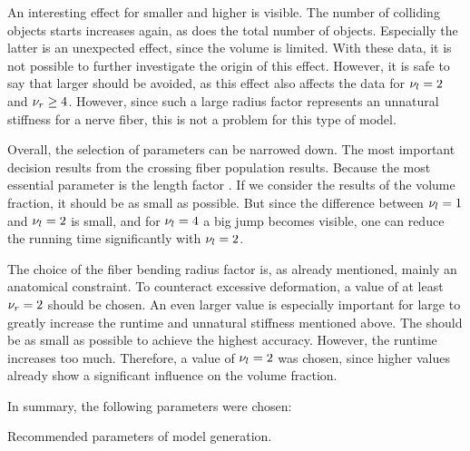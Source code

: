 An interesting effect for smaller \segLengthFactor{} and higher \segRadiusFactor{} is visible.
The number of colliding objects starts increases again, as does the total number of objects.
Especially the latter is an unexpected effect, since the volume is limited.
With these data, it is not possible to further investigate the origin of this effect.
However, it is safe to say that larger \segRadiusFactor{} should be avoided, as this effect also affects the data for $\textnormal{$\nu_{l}$} = 2$ and $\textnormal{$\nu_{r}$} \geq 4$.
However, since such a large radius factor represents an unnatural stiffness for a nerve fiber, this is not a problem for this type of model.
\par
%
Overall, the selection of parameters can be narrowed down.
The most important decision results from the crossing fiber population results.
Because the most essential parameter is the length factor \segLengthFactor{}.
If we consider the results of the volume fraction, it should be as small as possible.
But since the difference between $\textnormal{$\nu_{l}$}=\SI{1}{}$ and $\textnormal{$\nu_{l}$}=\SI{2}{}$ is small, and for $\textnormal{$\nu_{l}$}=\SI{4}{}$ a big jump becomes visible, one can reduce the running time significantly with $\textnormal{$\nu_{l}$}=\SI{2}{}$.
\par
%
The choice of the fiber bending radius factor \segRadiusFactor{} is, as already mentioned, mainly an anatomical constraint.
To counteract excessive deformation, a value of at least $\textnormal{$\nu_{r}$} = \SI{2}{}$ should be chosen.
An even larger value is especially important for large \segLengthFactor{} to greatly increase the runtime and unnatural stiffness mentioned above.
The \segLengthFactor{} should be as small as possible to achieve the highest accuracy.
However, the runtime increases too much.
Therefore, a value of $\textnormal{$\nu_{l}$} = \SI{2}{}$ was chosen, since higher values already show a significant influence on the volume fraction.
\par
%
In summary, the following parameters were chosen:
%
\begin{table}[H]
%
\centering
\caption{Recommended parameters of model generation.}
\label{tab:parameterSetup}
\end{table}
